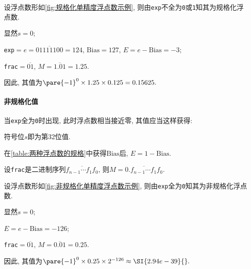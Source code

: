 \documentclass{ctexart}
\def\binaryseq#1{{\texttt{#1}}}
\begin{document}
\begin{sample}
    \begin{ex}
        设浮点数形如\cref{fig:规格化单精度浮点数示例}, 则由\colorbox{expgreencolor}{\texttt{exp}}不全为\binaryseq{0}或\binaryseq{1}知其为规格化浮点数.
        \begin{cenum}
            \item 显然$s=0$;
            \item \texttt{exp}$=e=\overline{01111100} = 124$, $\mathrm{Bias} = 127$, $E = e-\mathrm{Bias} = -3$;
            \item \texttt{frac}$=\overline{01}$, $M = \overline{1.01} = 1.25$.
        \end{cenum}
        因此, 其值为$\pare{-1}^0\times 1.25\times 0.125 = 0.15625.$
    \end{ex}
\end{sample}


\paragraph{非规格化值} %

\label{par:非规格化值}

当\colorbox{expgreencolor}{\texttt{exp}}全为\binaryseq{0}时出现, 此时浮点数相当接近零, 其值应当这样获得:
\begin{cenum}
    \item 符号位$s$即为\colorbox{signbluecolor}{第32位}值.
    \item 在\cref{table:两种浮点数的规格}中获得$\mathrm{Bias}$后, $E = 1 - \mathrm{Bias}$.
    \item 设\colorbox{significandcolor}{\texttt{frac}}是二进制序列$\overline{f_{n-1}\cdots f_1f_0}$, 则$M = \overline{0.f_{n-1}\cdots f_1f_0}$.
\end{cenum}
\begin{sample}
    \begin{ex}
        设浮点数形如\cref{fig:非规格化单精度浮点数示例}, 则由\colorbox{expgreencolor}{\texttt{exp}}全为\binaryseq{0}知其为非规格化浮点数.
        \begin{cenum}
            \item 显然$s=0$;
            \item $E = e-\mathrm{Bias} = -126$;
            \item \texttt{frac}$=\overline{01}$, $M = \overline{0.01} = 0.25$.
        \end{cenum}
        因此, 其值为$\pare{-1}^0\times 0.25\times 2^{-126} \approx \SI{2.94e-39}{}.$
    \end{ex}
\end{sample}
\end{document}

